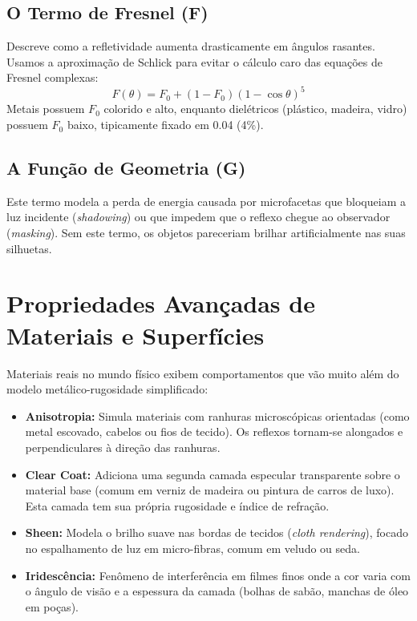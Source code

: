 \subsection{O Termo de Fresnel (F)}
Descreve como a refletividade aumenta drasticamente em ângulos rasantes. Usamos a aproximação de Schlick para evitar o cálculo caro das equações de Fresnel complexas:
\begin{equation}
    F(\theta) = F_0 + (1-F_0)(1-\cos\theta)^5
\end{equation}
Metais possuem $F_0$ colorido e alto, enquanto dielétricos (plástico, madeira, vidro) possuem $F_0$ baixo, tipicamente fixado em 0.04 (4\%).

\subsection{A Função de Geometria (G)}
Este termo modela a perda de energia causada por microfacetas que bloqueiam a luz incidente (\textit{shadowing}) ou que impedem que o reflexo chegue ao observador (\textit{masking}). Sem este termo, os objetos pareceriam brilhar artificialmente nas suas silhuetas.

\section{Propriedades Avançadas de Materiais e Superfícies}

Materiais reais no mundo físico exibem comportamentos que vão muito além do modelo metálico-rugosidade simplificado:

\begin{itemize}
    \item \textbf{Anisotropia:} Simula materiais com ranhuras microscópicas orientadas (como metal escovado, cabelos ou fios de tecido). Os reflexos tornam-se alongados e perpendiculares à direção das ranhuras.
    \item \textbf{Clear Coat:} Adiciona uma segunda camada especular transparente sobre o material base (comum em verniz de madeira ou pintura de carros de luxo). Esta camada tem sua própria rugosidade e índice de refração.
    \item \textbf{Sheen:} Modela o brilho suave nas bordas de tecidos (\textit{cloth rendering}), focado no espalhamento de luz em micro-fibras, comum em veludo ou seda.
    \item \textbf{Iridescência:} Fenômeno de interferência em filmes finos onde a cor varia com o ângulo de visão e a espessura da camada (bolhas de sabão, manchas de óleo em poças).
\end{itemize}

